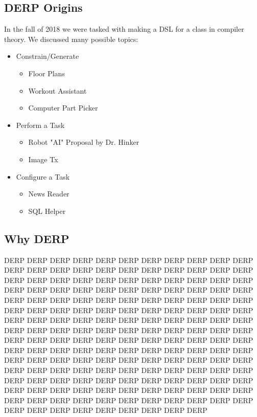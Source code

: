 \documentclass{article}
\begin{document}
\subsection{DERP Origins}
In the fall of 2018 we were tasked with making a DSL for a class in compiler theory. We discussed many possible topics:
\begin{itemize}
    \item{Constrain/Generate}
    \begin{itemize}
        \item{Floor Plans}
        \item{Workout Assistant}
        \item{Computer Part Picker}
    \end{itemize}
    \item{Perform a Task}
    \begin{itemize}
        \item{Robot "AI" Proposal by Dr. Hinker}
        \item{Image Tx}
    \end{itemize}
    \item{Configure a Task}
    \begin{itemize}
        \item{News Reader}
        \item{SQL Helper}        
    \end{itemize}
\end{itemize}

\subsection{Why DERP}
DERP DERP DERP DERP DERP DERP DERP DERP DERP DERP DERP DERP DERP DERP DERP DERP DERP DERP DERP DERP DERP DERP DERP DERP DERP DERP DERP DERP DERP DERP DERP DERP DERP DERP DERP DERP DERP DERP DERP DERP DERP DERP DERP DERP DERP DERP DERP DERP DERP DERP DERP DERP DERP DERP DERP DERP DERP DERP DERP DERP DERP DERP DERP DERP DERP DERP DERP DERP DERP DERP DERP DERP DERP DERP DERP DERP DERP DERP DERP DERP DERP DERP DERP DERP DERP DERP DERP DERP DERP DERP DERP DERP DERP DERP DERP DERP DERP DERP DERP DERP DERP DERP DERP DERP DERP DERP DERP DERP DERP DERP DERP DERP DERP DERP DERP DERP DERP DERP DERP DERP DERP DERP DERP DERP DERP DERP DERP DERP DERP DERP DERP DERP DERP DERP DERP DERP DERP DERP DERP DERP DERP DERP DERP DERP DERP DERP DERP DERP DERP DERP DERP DERP DERP DERP DERP DERP DERP DERP DERP DERP DERP DERP DERP DERP DERP DERP DERP DERP DERP DERP DERP DERP DERP DERP 
\end{document}

